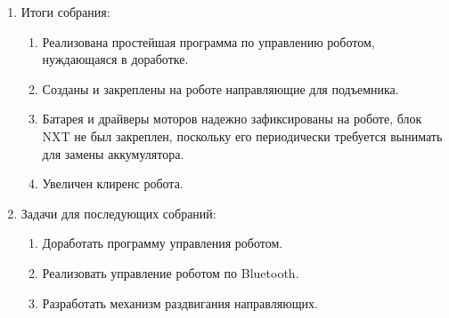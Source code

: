 \begin{enumerate}
\begin{enumerate}
    \end{enumerate}
    
	\item Итоги собрания: \newline
	\begin{enumerate}
	  \item  Реализована простейшая программа по управлению роботом, нуждающаяся в доработке.\newline
	  
      \item  Созданы и закреплены на роботе направляющие для подъемника.\newline
      
      \item  Батарея и драйверы моторов надежно зафиксированы на роботе, блок NXT не был закреплен, поскольку его периодически требуется вынимать для замены аккумулятора.\newline
      
      \item  Увеличен клиренс робота.\newline
      
    \end{enumerate}
    
	\item Задачи для последующих собраний:\newline
	\begin{enumerate}
	  \item Доработать программу управления роботом.\newline
	  
	  \item Реализовать управление роботом по Bluetooth.\newline
	  
	  \item Разработать механизм раздвигания направляющих.\newline

    \end{enumerate}     
\end{enumerate}

\fillpage
